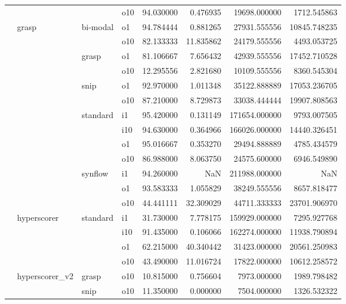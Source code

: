 \begin{longtable}{llllrrrr}
      &     &         & o10 &  94.030000 &   0.476935 &     19698.000000 &   1712.545863 \\
      & grasp & bi-modal & o1 &  94.784444 &   0.881265 &     27931.555556 &  10845.748235 \\
      &     &         & o10 &  82.133333 &  11.835862 &     24179.555556 &   4493.053725 \\
      &     & grasp & o1 &  81.106667 &   7.656432 &     42939.555556 &  17452.710528 \\
      &     &         & o10 &  12.295556 &   2.821680 &     10109.555556 &   8360.545304 \\
      &     & snip & o1 &  92.970000 &   1.011348 &     35122.888889 &  17053.236705 \\
      &     &         & o10 &  87.210000 &   8.729873 &     33038.444444 &  19907.808563 \\
      &     & standard & i1 &  95.420000 &   0.131149 &    171654.000000 &   9793.007505 \\
      &     &         & i10 &  94.630000 &   0.364966 &    166026.000000 &  14440.326451 \\
      &     &         & o1 &  95.016667 &   0.353270 &     29494.888889 &   4785.434579 \\
      &     &         & o10 &  86.988000 &   8.063750 &     24575.600000 &   6946.549890 \\
      &     & synflow & i1 &  94.260000 &        NaN &    211988.000000 &           NaN \\
      &     &         & o1 &  93.583333 &   1.055829 &     38249.555556 &   8657.818477 \\
      &     &         & o10 &  44.441111 &  32.309029 &     44711.333333 &  23701.906970 \\
      & hyperscorer & standard & i1 &  31.730000 &   7.778175 &    159929.000000 &   7295.927768 \\
      &     &         & i10 &  91.435000 &   0.106066 &    162274.000000 &  11938.790894 \\
      &     &         & o1 &  62.215000 &  40.340442 &     31423.000000 &  20561.250983 \\
      &     &         & o10 &  43.490000 &  11.016724 &     17822.000000 &  10612.258572 \\
      & hyperscorer\_v2 & grasp & o10 &  10.815000 &   0.756604 &      7973.000000 &   1989.798482 \\
      &     & snip & o10 &  11.350000 &   0.000000 &      7504.000000 &   1326.532322 \\

\end{longtable}
